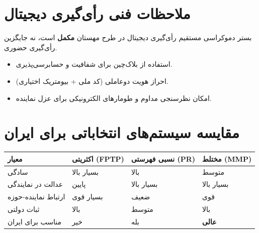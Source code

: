 \section{ملاحظات فنی رأی‌گیری دیجیتال}

\begin{modernbox}{بستر دموکراسی مستقیم}
رأی‌گیری دیجیتال در طرح مهستان \textbf{مکمل} است، نه جایگزین رأی‌گیری حضوری.
\begin{itemize}
    \item استفاده از بلاک‌چین برای شفافیت و حسابرسی‌پذیری.
    \item احراز هویت دوعاملی (کد ملی + بیومتریک اختیاری).
    \item امکان نظرسنجی مداوم و طومارهای الکترونیکی برای عزل نماینده.
\end{itemize}
\end{modernbox}

\section{مقایسه سیستم‌های انتخاباتی برای ایران}

\begin{center}
\begin{tabular}{R{3cm} C{3cm} C{3cm} C{3cm}}
\hline
\textbf{معیار} & \textbf{اکثریتی (FPTP)} & \textbf{نسبی فهرستی (PR)} & \textbf{مختلط (MMP)} \\
\hline
سادگی & بسیار بالا & بالا & متوسط \\
عدالت در نمایندگی & پایین & بسیار بالا & بسیار بالا \\
ارتباط نماینده-حوزه & بسیار قوی & ضعیف & قوی \\
ثبات دولتی & بالا & متوسط & بالا \\
مناسب برای ایران & خیر & بله & \textbf{عالی} \\
\hline
\end{tabular}
\end{center}

